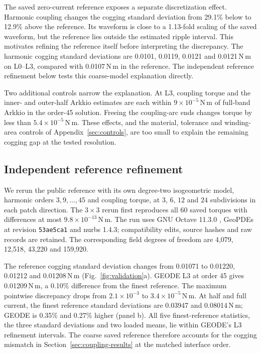 \documentclass{anvil-paper}
\begin{document}
The saved zero-current reference exposes a separate discretization effect. Harmonic coupling changes the
cogging standard deviation from 29.1\% below to 12.9\% above the reference.
Its waveform is close to a 1.13-fold scaling of the saved waveform, but the
reference lies outside the estimated ripple interval. This motivates
refining the reference itself before interpreting the discrepancy. The harmonic cogging standard deviations are
0.0101, 0.0119, 0.0121 and 0.0121\,N\,m on L0--L3, compared with
0.0107\,N\,m in the reference. The independent reference refinement below tests this coarse-model
explanation directly.

Two additional controls narrow the explanation. At L3, coupling torque
and the inner- and outer-half Arkkio estimates are each within
$9\times10^{-5}$\,N\,m of full-band Arkkio in the order-45 solution.
Freeing the coupling-arc ends changes torque by less than
$5.4\times10^{-5}$\,N\,m. These effects, and the material, tolerance and
winding-area controls of Appendix~\ref{sec:controls}, are too small to
explain the remaining cogging gap at the tested resolution.

\subsection{Independent reference refinement}\label{sec:refinement}
We rerun the public reference with its own degree-two isogeometric model,
harmonic orders $3,9,\ldots,45$ and coupling torque, at $3$, $6$, $12$ and
$24$ subdivisions in each patch direction. The $3\times3$ rerun first
reproduces all 60 saved torques with differences at most $9.8\times10^{-13}$\,N\,m.
The run uses GNU Octave 11.3.0 \citep{eaton2026octave}, GeoPDEs
\citep{defalco2011geopdes,vazquez2016geopdes} at revision \texttt{53ae5ca1}
and nurbs 1.4.3; compatibility edits, source hashes and raw records are retained.
The corresponding field degrees of freedom are 4,079, 12,518, 43,220
and 159,920.

The reference cogging standard deviation changes from 0.01071 to 0.01220,
0.01212 and 0.01208\,N\,m (Fig.~\ref{fig:validation}a). GEODE L3 at order
45 gives 0.01209\,N\,m, a 0.10\% difference from the finest reference.
The maximum pointwise discrepancy drops from $2.1\times10^{-3}$ to
$3.4\times10^{-5}$\,N\,m. At half and full current, the finest reference
standard deviations are 0.03947 and 0.08014\,N\,m;
GEODE is 0.35\% and 0.27\% higher (panel b). All five finest-reference
statistics, the three
standard deviations and two loaded means, lie within GEODE's L3
refinement intervals. The coarse saved reference therefore accounts for
the cogging mismatch in Section~\ref{sec:coupling-results} at the matched interface order.
\end{document}
